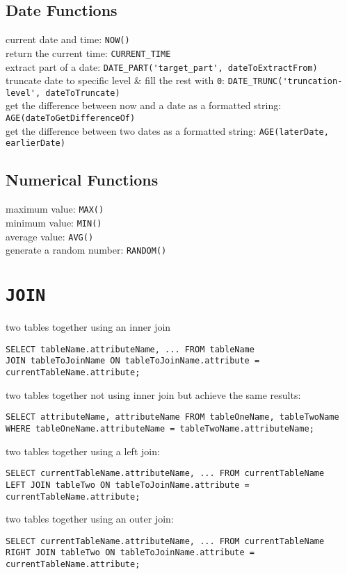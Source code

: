 \documentclass[a4paper,11pt]{article}
\begin{document}
\subsection{Date Functions}
current date and time: \verb|NOW()|\\
return the current time: \verb|CURRENT_TIME|\\
extract part of a date: \verb|DATE_PART('target_part', dateToExtractFrom)|\\
truncate date to specific level \& fill the rest with \verb|0|: \verb|DATE_TRUNC('truncation-level', dateToTruncate)|\\
get the difference between now and a date as a formatted string: \verb|AGE(dateToGetDifferenceOf)|\\
get the difference between two dates as a formatted string: \verb|AGE(laterDate, earlierDate)|

\subsection{Numerical Functions}
maximum value: \verb|MAX()|\\
minimum value: \verb|MIN()|\\
average value: \verb|AVG()|\\
generate a random number: \verb|RANDOM()|\\


\section{\texttt{JOIN}}
two tables together using an inner join
\begin{verbatim}
SELECT tableName.attributeName, ... FROM tableName
JOIN tableToJoinName ON tableToJoinName.attribute = currentTableName.attribute;
\end{verbatim}
two tables together not using inner join but achieve the same results:
\begin{verbatim}
SELECT attributeName, attributeName FROM tableOneName, tableTwoName
WHERE tableOneName.attributeName = tableTwoName.attributeName;
\end{verbatim}

two tables together using a left join:
\begin{verbatim}
SELECT currentTableName.attributeName, ... FROM currentTableName
LEFT JOIN tableTwo ON tableToJoinName.attribute = currentTableName.attribute;
\end{verbatim}

two tables together using an outer join:
\begin{verbatim}
SELECT currentTableName.attributeName, ... FROM currentTableName
RIGHT JOIN tableTwo ON tableToJoinName.attribute = currentTableName.attribute;
\end{verbatim}
\end{document}

